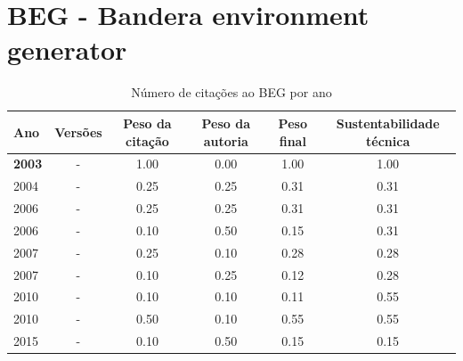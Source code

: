 \section{BEG - Bandera environment generator}


\begin{table}[H]
\caption{Número de citações ao BEG  por ano}
\centering
\begin{tabular}{| l | c | c | c | c | c |}
  \hline
  Ano & Versões & Peso da citação & Peso da autoria & Peso final & Sustentabilidade técnica \\
  \hline
            {\bf 2003}
          &
          -
          &
          1.00
          &
          0.00
          &
          1.00
          &
            {\color{blue} 1.00}
          \\
\hline
            2004
          &
          -
          &
          0.25
          &
          0.25
          &
          0.31
          &
            {\color{red} 0.31}
          \\
\hline
            2006
          &
          -
          &
          0.25
          &
          0.25
          &
          0.31
          &
            {\color{red} 0.31}
          \\
            2006
          &
          -
          &
          0.10
          &
          0.50
          &
          0.15
          &
            {\color{red} 0.31}
          \\
\hline
            2007
          &
          -
          &
          0.25
          &
          0.10
          &
          0.28
          &
            {\color{red} 0.28}
          \\
            2007
          &
          -
          &
          0.10
          &
          0.25
          &
          0.12
          &
            {\color{red} 0.28}
          \\
\hline
            2010
          &
          -
          &
          0.10
          &
          0.10
          &
          0.11
          &
            {\color{blue} 0.55}
          \\
            2010
          &
          -
          &
          0.50
          &
          0.10
          &
          0.55
          &
            {\color{blue} 0.55}
          \\
\hline
            2015
          &
          -
          &
          0.10
          &
          0.50
          &
          0.15
          &
            {\color{red} 0.15}
          \\
\hline
\end{tabular}
\end{table}



